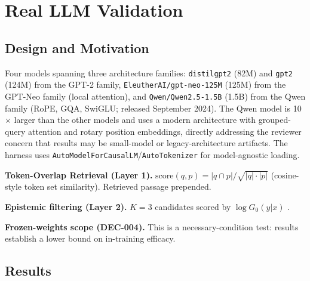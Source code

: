 \documentclass[11pt]{article}
\begin{document}
\section{Real LLM Validation}
\label{sec:real-lm}

\subsection{Design and Motivation}

Four models spanning three architecture families: \texttt{distilgpt2} (82M) and \texttt{gpt2} (124M) from the GPT-2 family, \texttt{EleutherAI/gpt-neo-125M} (125M) from the GPT-Neo family (local attention), and \texttt{Qwen/Qwen2.5-1.5B} (1.5B) from the Qwen family (RoPE, GQA, SwiGLU; released September 2024). The Qwen model is 10$\times$ larger than the other models and uses a modern architecture with grouped-query attention and rotary position embeddings, directly addressing the reviewer concern that results may be small-model or legacy-architecture artifacts. The harness uses \texttt{AutoModelForCausalLM}/\texttt{AutoTokenizer} for model-agnostic loading.

\textbf{Token-Overlap Retrieval (Layer 1).} $\text{score}(q, p) = |q \cap p| / \sqrt{|q| \cdot |p|}$ (cosine-style token set similarity). Retrieved passage prepended.

\textbf{Epistemic filtering (Layer 2).} $K{=}3$ candidates scored by $\log G_0(y|x)$ \cite{fu2025selfverification}.

\textbf{Frozen-weights scope (DEC-004).} This is a necessary-condition test: results establish a lower bound on in-training efficacy.

\subsection{Results}
\end{document}
